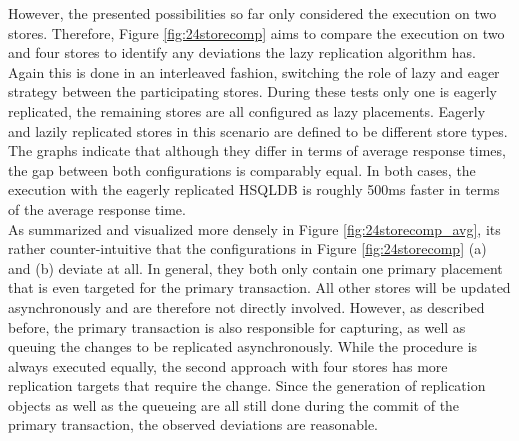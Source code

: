 
However, the presented possibilities so far only considered the execution on two stores. Therefore, Figure \ref{fig:24storecomp} aims
to compare the execution on two and four stores to identify any deviations the lazy replication algorithm has. 
Again this is done in an interleaved fashion, switching the role of lazy and eager strategy between the participating stores.
During these tests only one is eagerly replicated, the remaining stores are all configured as lazy placements. Eagerly and lazily replicated stores
in this scenario are defined to be different store types.\\
The graphs indicate that although they differ in terms of average response times, the gap between both configurations is comparably equal.
In both cases, the execution with the eagerly replicated HSQLDB is roughly 500ms faster in terms of the average response time.\\

As summarized and visualized more densely in Figure \ref{fig:24storecomp_avg},
its rather counter-intuitive that the configurations in Figure \ref{fig:24storecomp} (a) and (b) deviate at all. 
In general, they both only contain one primary placement that is even targeted for the primary transaction.
All other stores will be updated asynchronously and are therefore not directly involved.
However, as described before, the primary transaction is also responsible for capturing, as well as queuing the changes to be replicated asynchronously.
While the procedure is always executed equally, the second approach with four stores has more replication targets that require the change. 
Since the generation of replication objects as well as the queueing are all still done during the commit of the primary transaction, the observed
deviations are reasonable.\\

